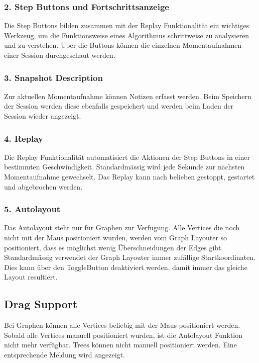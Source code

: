 \documentclass[11pt,a4paper,english,oneside]{book}
\numberwithin{equation}{chapter}
\begin{document}
	\subsubsection{2. Step Buttons und Fortschrittsanzeige}
	Die Step Buttons bilden zusammen mit der Replay Funktionalität ein wichtiges Werkzeug, um die Funktionsweise eines Algorithmus schrittweise zu analysieren und zu verstehen. Über die Buttons können die einzelnen Momentaufnahmen einer Session durchgeschaut werden.
	
	\subsubsection{3. Snapshot Description}
	Zur aktuellen Momentaufnahme können Notizen erfasst werden. Beim Speichern der Session werden diese ebenfalls gespeichert und werden beim Laden der Session wieder angezeigt.
	
	\subsubsection{4. Replay}
	Die Replay Funktionalität automatisiert die Aktionen der Step Buttons in einer bestimmten Geschwindigkeit. Standardmässig wird jede Sekunde zur nächsten Momentaufnahme gewechselt. Das Replay kann nach belieben gestoppt, gestartet und abgebrochen werden.
	
	\subsubsection{5. Autolayout}
	Das Autolayout steht nur für Graphen zur Verfügung. Alle Vertices die noch nicht mit der Maus positioniert wurden, werden vom Graph Layouter so positioniert, dass es möglichst wenig Überschneidungen der Edges gibt. Standardmässig verwendet der Graph Layouter immer zufällige Startkoordinaten. Dies kann über den ToggleButton deaktiviert werden, damit immer das gleiche Layout resultiert.
	
	\subsection{Drag Support}
	Bei Graphen können alle Vertices beliebig mit der Maus positioniert werden. Sobald alle Vertices manuell positioniert wurden, ist die Autolayout Funktion nicht mehr verfügbar. Trees können nicht manuell positioniert werden. Eine entsprechende Meldung wird angezeigt.
	
\end{document}

